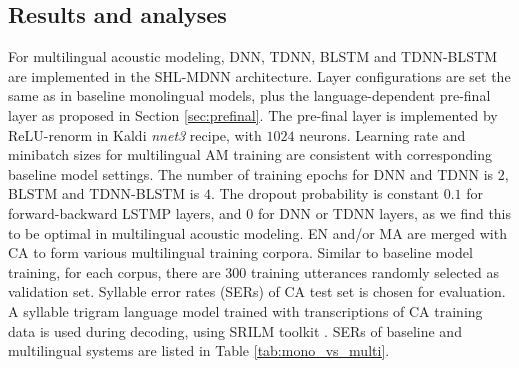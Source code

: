 \documentclass[a4paper]{article}
\begin{document}
\subsection{Results and analyses}
For multilingual acoustic modeling, DNN, TDNN, BLSTM and TDNN-BLSTM  are implemented in the SHL-MDNN architecture. Layer configurations are set the same as in baseline monolingual models, plus the language-dependent pre-final layer as proposed in Section \ref{sec:prefinal}. The pre-final layer is implemented by ReLU-renorm in Kaldi \emph{nnet3} recipe, with $1024$ neurons. Learning rate and minibatch sizes for multilingual AM training are consistent with corresponding baseline model settings. The number of training epochs for DNN and TDNN is $2$, BLSTM and TDNN-BLSTM is $4$. The dropout probability is constant $0.1$ for forward-backward LSTMP layers, and $0$ for DNN or TDNN layers, as we find this to be optimal in multilingual acoustic modeling.
EN and/or MA are merged with CA to form various multilingual training corpora. Similar to baseline model training, for each corpus, there are $300$ training utterances randomly selected as validation set. Syllable error rates (SERs) of CA test set is chosen for evaluation. A syllable trigram language model trained with transcriptions of CA training data is used during decoding, using SRILM toolkit \cite{Stolcke02srilm--}. SERs of baseline and multilingual systems are listed in Table \ref{tab:mono_vs_multi}.
\end{document}
